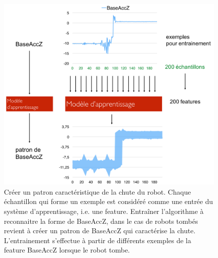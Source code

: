 \begin{figure}[h]
	\centering\includegraphics[width=12cm]{images/patron.png}
	\caption[Créer un patron caractéristique de la chute du robot]{Créer un patron caractéristique de la chute du robot. Chaque échantillon qui forme un exemple est considéré comme une entrée du système d'apprentissage, i.e. une feature. Entraîner l'algorithme à reconnaitre la forme de BaseAccZ, dans le cas de robots tombés revient à créer un patron de BaseAccZ qui caractérise la chute. L'entrainement s'effectue à partir de différents exemples de la feature BaseAccZ lorsque le robot tombe.}
	\label{fig:Créer un patron caractéristique de la chute du robot}
\end{figure}

